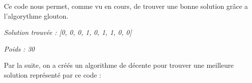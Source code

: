 \vspace{5mm}
\noindent
Ce code nous permet, comme vu en cours, de trouver une bonne solution grâce a l'algorythme glouton.

\textit{Solution trouvée : [0, 0, 0, 1, 0, 1, 1, 0, 0]}

\textit{Poids : 30}




%
%

\vspace{5mm}
\noindent
{}
\vspace{2mm}


\noindent
Par la suite, on a créés un algorithme de décente pour trouver une meilleure solution représenté par ce code :

